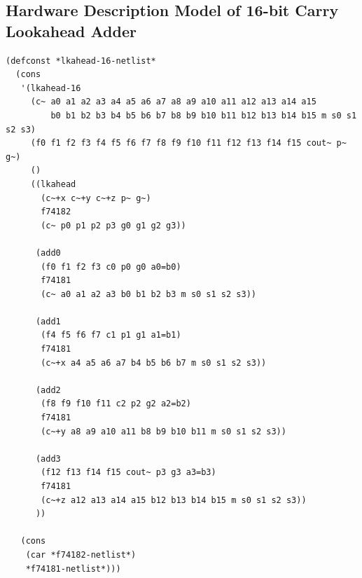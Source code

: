\documentclass[fleqn,10pt]{SelfArx} %
\begin{document}
\subsection*{Hardware Description Model of 16-bit Carry Lookahead Adder}
\begin{lstlisting}
(defconst *lkahead-16-netlist*
  (cons
   '(lkahead-16
     (c~ a0 a1 a2 a3 a4 a5 a6 a7 a8 a9 a10 a11 a12 a13 a14 a15
         b0 b1 b2 b3 b4 b5 b6 b7 b8 b9 b10 b11 b12 b13 b14 b15 m s0 s1 s2 s3)
     (f0 f1 f2 f3 f4 f5 f6 f7 f8 f9 f10 f11 f12 f13 f14 f15 cout~ p~ g~)
     ()
     ((lkahead
       (c~+x c~+y c~+z p~ g~)
       f74182
       (c~ p0 p1 p2 p3 g0 g1 g2 g3))

      (add0
       (f0 f1 f2 f3 c0 p0 g0 a0=b0)
       f74181
       (c~ a0 a1 a2 a3 b0 b1 b2 b3 m s0 s1 s2 s3))

      (add1
       (f4 f5 f6 f7 c1 p1 g1 a1=b1)
       f74181
       (c~+x a4 a5 a6 a7 b4 b5 b6 b7 m s0 s1 s2 s3))

      (add2
       (f8 f9 f10 f11 c2 p2 g2 a2=b2)
       f74181
       (c~+y a8 a9 a10 a11 b8 b9 b10 b11 m s0 s1 s2 s3))

      (add3
       (f12 f13 f14 f15 cout~ p3 g3 a3=b3)
       f74181
       (c~+z a12 a13 a14 a15 b12 b13 b14 b15 m s0 s1 s2 s3))
      ))

   (cons
    (car *f74182-netlist*)
    *f74181-netlist*)))
\end{lstlisting}
\end{document}
